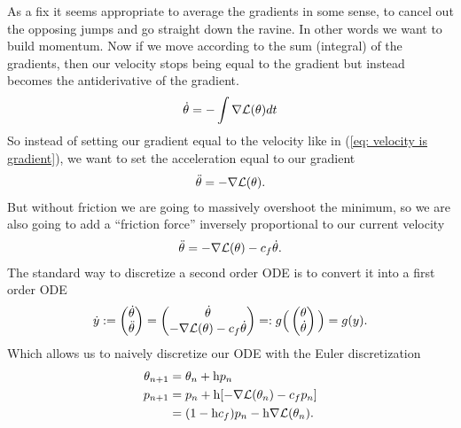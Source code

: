 As a fix it seems appropriate to average the gradients in some sense, to
cancel out the opposing jumps and go straight down the ravine. In other words
we want to build momentum. Now if we move according to the sum (integral) of
the gradients, then our velocity stops being equal to the gradient but instead
becomes the antiderivative of the gradient.
\begin{align*}
	\dot{\theta} = -\int\nabla\mathcal{L}(\theta)dt
\end{align*}
So instead of setting our gradient equal to the velocity like in (\ref{eq:
velocity is gradient}), we want to set the acceleration equal to our gradient
%
\begin{align*}
	\ddot{\theta} = -\nabla \mathcal{L}(\theta).
\end{align*}
%
But without friction we are going to massively overshoot the minimum, so we are
also going to add a ``friction force'' inversely proportional to our current
velocity
%
\begin{align}\label{eq: acceleration is gradient + friction}
	\ddot{\theta} = -\nabla \mathcal{L}(\theta) - c_f \dot{\theta}.
\end{align}
%
The standard way to discretize a second order ODE is to convert it into a first
order ODE
%
\begin{align*}
	\dot{y} := \begin{pmatrix}
		\dot{\theta}\\
		\ddot{\theta}
	\end{pmatrix}
	= \begin{pmatrix}
		\dot{\theta} \\
		-\nabla \mathcal{L}(\theta) - c_f \dot{\theta}
	\end{pmatrix}
	=: g\Big(\begin{pmatrix}
		\theta \\
		\dot{\theta}
	\end{pmatrix}\Big)
	= g(y).
\end{align*}
%
Which allows us to naively discretize our ODE with the Euler discretization
%
\begin{subequations}
\begin{align}
	\theta_{n+1} &= \theta_n + \text{h} p_n \label{eq: naive momentum move}\\
	p_{n+1} &= p_n + \text{h} [-\nabla \mathcal{L}(\theta_n) - c_f p_n]
	\label{eq: naive momentum}\\ \nonumber
	&= (1-\text{h}c_f)p_n - \text{h}\nabla \mathcal{L}(\theta_n).
\end{align}
\end{subequations}
